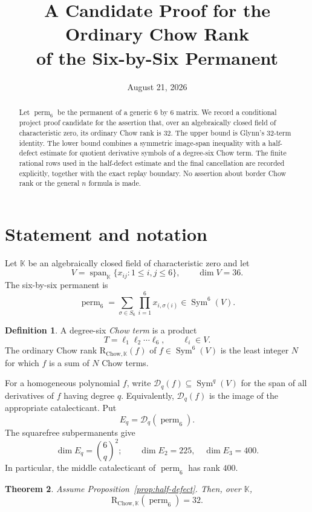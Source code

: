 \documentclass[11pt]{amsart}
\title[A Candidate Proof for the Six-by-Six Permanent]
{A Candidate Proof for the Ordinary Chow Rank\\
of the Six-by-Six Permanent}
\author{}
\date{August 21, 2026}
\newcommand{\K}{\mathbb{K}}
\newcommand{\Sym}{\operatorname{Sym}}
\newcommand{\Span}{\operatorname{span}}
\newcommand{\perm}{\operatorname{perm}}
\newcommand{\CR}{\mathrm{R}_{\mathrm{Chow},\K}}
\newcommand{\cD}{\mathcal{D}}
\newtheorem{theorem}{Theorem}[section]
\theoremstyle{definition}
\newtheorem{definition}[theorem]{Definition}
\begin{document}
\begin{abstract}
Let \(\perm_6\) be the permanent of a generic \(6\) by \(6\) matrix.
We record a conditional project proof candidate for the assertion that, over
an algebraically closed field of characteristic zero, its ordinary Chow rank
is \(32\).  The upper bound is
Glynn's \(32\)-term identity.  The lower bound combines a symmetric
image-span inequality with a half-defect estimate for quotient derivative
symbols of a degree-six Chow term.  The finite rational rows used in the
half-defect estimate and the final cancellation are recorded explicitly,
together with the exact replay boundary.  No assertion about border Chow
rank or the general \(n\) formula is made.
\end{abstract}

\maketitle

\section{Statement and notation}

Let \(\K\) be an algebraically closed field of characteristic zero and let
\[
 V=\Span_{\K}\{x_{ij}:1\leq i,j\leq6\},
 \qquad \dim V=36.
\]
The six-by-six permanent is
\[
 \perm_6=\sum_{\sigma\in S_6}\prod_{i=1}^{6}x_{i,\sigma(i)}
 \in\Sym^6(V).
\]

\begin{definition}
A degree-six \emph{Chow term} is a product
\[
 T=\ell_1\ell_2\cdots\ell_6,
 \qquad \ell_i\in V.
\]
The ordinary Chow rank \(\CR(f)\) of \(f\in\Sym^6(V)\) is the least
integer \(N\) for which \(f\) is a sum of \(N\) Chow terms.
\end{definition}

For a homogeneous polynomial \(f\), write \(\cD_q(f)\subseteq\Sym^q(V)\)
for the span of all derivatives of \(f\) having degree \(q\).  Equivalently,
\(\cD_q(f)\) is the image of the appropriate catalecticant.  Put
\[
 E_q=\cD_q(\perm_6).
\]
The squarefree subpermanents give
\[
 \dim E_q=\binom{6}{q}^2;
 \qquad \dim E_2=225,\quad \dim E_3=400.
\]
In particular, the middle catalecticant of \(\perm_6\) has rank \(400\).

\begin{theorem}\label{thm:main}
Assume Proposition~\ref{prop:half-defect}.  Then, over \(\K\),
\[
 \boxed{\CR(\perm_6)=32.}
\]
\end{theorem}
\end{document}
